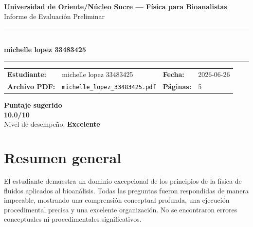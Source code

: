 \documentclass[11pt,a4paper]{article}
\begin{document}
\begin{center}
  {\Large\bfseries\color{azulTitulo} Universidad de Oriente/Núcleo Sucre --- Física para Bioanalistas}\\[4pt]
  {\large Informe de Evaluación Preliminar}\\[12pt]
  \rule{\linewidth}{1.2pt}\\[6pt]
  {\LARGE\bfseries michelle lopez 33483425}\\[4pt]
  \rule{\linewidth}{0.6pt}
\end{center}

\vspace{4pt}
\begin{tcolorbox}[cajaTitulo, title=Datos del informe]
\begin{tabular}{@{}llll@{}}
  \textbf{Estudiante:}  & michelle lopez 33483425  &
  \textbf{Fecha:}       & 2026-06-26 \\[4pt]
  \textbf{Archivo PDF:} & \texttt{michelle\_lopez\_33483425.pdf}  &
  \textbf{Páginas:}     & 5 \\
\end{tabular}
\end{tcolorbox}

\vspace{6pt}
\begin{center}
  \begin{tcolorbox}[
    enhanced,
    colback=white, colframe=desempeno_excelente,
    width=0.62\linewidth,
    boxrule=2pt,
    halign=center, valign=center,
    top=8pt, bottom=8pt,
  ]
    \centering
    {\large\bfseries Puntaje sugerido}\\[6pt]
    {\Huge\bfseries\color{desempeno_excelente} 10.0/10}\\[6pt]
    {\large Nivel de desempeño: \textbf{\color{desempeno_excelente} Excelente}}
  \end{tcolorbox}
\end{center}

\section*{Resumen general}
El estudiante demuestra un dominio excepcional de los principios de la física de fluidos aplicados al bioanálisis. Todas las preguntas fueron respondidas de manera impecable, mostrando una comprensión conceptual profunda, una ejecución procedimental precisa y una excelente organización. No se encontraron errores conceptuales ni procedimentales significativos.
\end{document}
